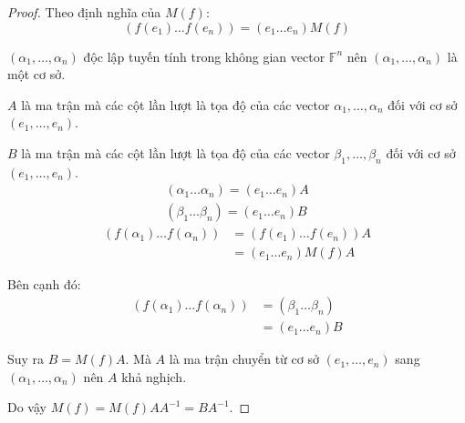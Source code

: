 \documentclass[class=nhvh-linear-algebra,crop=false]{standalone}
\begin{document}
\begin{proof}
    Theo định nghĩa của $M(f)$:
    \[
        (f(e_{1}) \ldots f(e_{n})) = (e_{1} \ldots e_{n})M(f)
    \]
    \par $(\alpha_{1}, \ldots, \alpha_{n})$ độc lập tuyến tính trong không gian vector $\mathbb{F}^{n}$ nên $(\alpha_{1}, \ldots, \alpha_{n})$ là một cơ sở.
    \par $A$ là ma trận mà các cột lần lượt là tọa độ của các vector $\alpha_{1}, \ldots, \alpha_{n}$ đối với cơ sở $(e_{1}, \ldots, e_{n})$.
    \par $B$ là ma trận mà các cột lần lượt là tọa độ của các vector $\beta_{1}, \ldots, \beta_{n}$ đối với cơ sở $(e_{1}, \ldots, e_{n})$.
    \[
        \begin{split}
            (\alpha_{1} \ldots \alpha_{n}) = (e_{1} \ldots e_{n})A \\
            (\beta_{1} \ldots \beta_{n}) = (e_{1} \ldots e_{n})B
        \end{split}
    \]
    \begin{align*}
        (f(\alpha_{1})\ldots f(\alpha_{n})) & = (f(e_{1})\ldots f(e_{n}))A \\
                                            & = (e_{1}\ldots e_{n})M(f)A
    \end{align*}
    \par Bên cạnh đó:
    \begin{align*}
        (f(\alpha_{1})\ldots f(\alpha_{n})) & = (\beta_{1} \ldots \beta_{n}) \\
                                            & = (e_{1} \ldots e_{n})B
    \end{align*}
    \par Suy ra $B = M(f)A$. Mà $A$ là ma trận chuyển từ cơ sở $(e_{1}, \ldots, e_{n})$ sang $(\alpha_{1}, \ldots, \alpha_{n})$ nên $A$ khả nghịch.
    \par Do vậy $M(f) = M(f)AA^{-1} = BA^{-1}$.
\end{proof}
\end{document}
